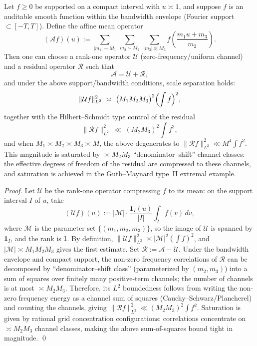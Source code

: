 \begin{proposition}\label{prop:gm-affine-average-rank1-residual}
Let \(f\ge 0\) be supported on a compact interval with \(u\asymp 1\), and suppose \(f\) is an auditable smooth function within the bandwidth envelope (Fourier support \(\subset[-T,T]\)).
Define the affine mean operator
\[
(\mathcal{A}f)(u)
:=\sum_{|m_1|\sim M_1}\ \sum_{m_2\sim M_2}\ \sum_{|m_3|\lesssim M_3}
f\!\left(\frac{m_1u+m_3}{m_2}\right).
\]
Then one can choose a rank-one operator \(\mathcal{U}\) (zero-frequency/uniform channel) and a residual operator \(\mathcal{R}\) such that
\[
\mathcal{A}=\mathcal{U}+\mathcal{R},
\]
and under the above support/bandwidth conditions, scale separation holds:
\[
\|\mathcal{U}f\|_{L^2}^2\ \asymp\ \bigl(M_1M_2M_3\bigr)^2\Bigl(\int f\Bigr)^2,
\]
together with the Hilbert--Schmidt type control of the residual
\[
\|\mathcal{R}f\|_{L^2}^2\ \ll\ (M_2M_3)^2\int f^2,
\]
and when \(M_1\asymp M_2\asymp M_3\asymp M\), the above degenerates to \(\|\mathcal{R}f\|_{L^2}^2\ll M^4\int f^2\).
This magnitude is saturated by \(\asymp M_2M_3\) ``denominator--shift'' channel classes: the effective degrees of freedom of the residual are compressed to these channels, and saturation is achieved in the Guth--Maynard type~II extremal example.
\end{proposition}

\begin{proof}
Let \(\mathcal{U}\) be the rank-one operator compressing \(f\) to its mean: on the support interval \(I\) of \(u\), take
\[
(\mathcal{U}f)(u):=\bigl|\mathcal{M}\bigr|\cdot \frac{\mathbf{1}_I(u)}{|I|}\int_I f(v)\,dv,
\]
where \(\mathcal{M}\) is the parameter set \(\{(m_1,m_2,m_3)\}\), so the image of \(\mathcal{U}\) is spanned by \(\mathbf{1}_I\), and the rank is \(1\).
By definition,
\(\|\mathcal{U}f\|_{L^2}^2\asymp |\mathcal{M}|^2(\int f)^2\), and \(|\mathcal{M}|\asymp M_1M_2M_3\) gives the first estimate.
Set \(\mathcal{R}:=\mathcal{A}-\mathcal{U}\).
Under the bandwidth envelope and compact support, the non-zero frequency correlations of \(\mathcal{R}\) can be decomposed by ``denominator--shift class'' (parameterized by \((m_2,m_3)\)) into a sum of squares over finitely many positive-term channels; the number of channels is at most \(\asymp M_2M_3\).
Therefore, its \(L^2\) boundedness follows from writing the non-zero frequency energy as a channel sum of squares (Cauchy--Schwarz/Plancherel) and counting the channels, giving
\(\|\mathcal{R}f\|_{L^2}^2\ll (M_2M_3)^2\int f^2\).
Saturation is given by rational grid concentration configurations: correlations concentrate on \(\asymp M_2M_3\) channel classes, making the above sum-of-squares bound tight in magnitude. \qed
\end{proof}

